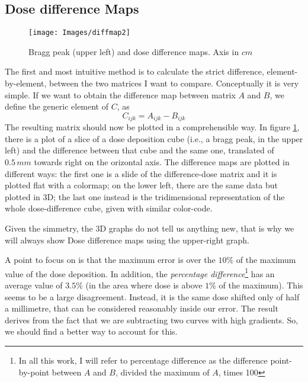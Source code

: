 \documentclass[12pt, a4paper, twoside]{book}
\begin{document}
\subsection{Dose difference Maps}
\begin{figure}[t!]
\texttt{[image: Images/diffmap2]}
\caption{Bragg peak (upper left) and dose difference maps. Axis in $cm$}
\label{fig:diff}
\end{figure}
The first and most intuitive method is to calculate the strict difference, element-by-element, between the two matrices I want to compare. Conceptually it is very simple. If we want to obtain the difference map between matrix $A$ and $B$, we define the generic element of $C$, as
\[
C_{ijk} = A_{ijk} - B_{ijk}
\]
The resulting matrix should now be plotted in a comprehensible way. In figure \ref{fig:diff}, there is a plot of a slice of a dose deposition cube (i.e., a bragg peak, in the upper left) and the difference between that cube and the same one, translated of $0.5\,mm$ towards right on the orizontal axis. 
The difference maps are plotted in different ways: the first one is a slide of the difference-dose matrix and it is plotted flat with a colormap; on the lower left, there are the same data but plotted in 3D; the last one instead is the tridimensional representation of the whole dose-difference cube, given with similar color-code.

Given the simmetry, the 3D graphs do not tell us anything new, that is why we will always show Dose difference maps using the upper-right graph.

A point to focus on is that the maximum error is over the $10\%$ of the maximum value of the dose deposition. In addition, the \emph{percentage difference}\footnote{In all this work, I will refer to percentage difference as the difference point-by-point between $A$ and $B$, divided the maximum of $A$, times 100} has an average value of $3.5\%$ (in the area where dose is above $1\%$ of the maximum). 
This seems to be a large disagreement. Instead, it is the same dose shifted only of half a millimetre, that can be considered reasonably inside our error. The result derives from the fact that we are subtracting two curves with high gradients. So, we should find a better way to account for this.
\end{document}
